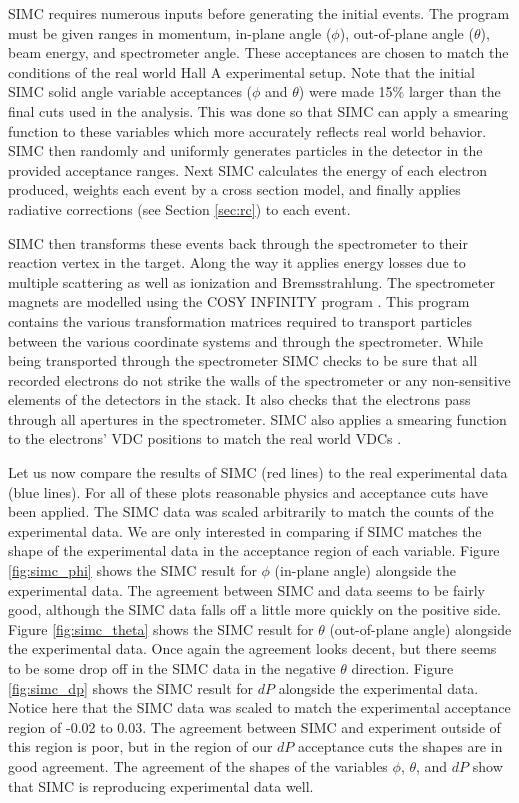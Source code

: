 SIMC requires numerous inputs before generating the initial events. The program must be given ranges in momentum, in-plane angle ($\phi$), out-of-plane angle ($\theta$), beam energy, and spectrometer angle. These acceptances are chosen to match the conditions of the real world Hall A experimental setup. Note that the initial SIMC solid angle variable acceptances ($\phi$ and $\theta$) were made 15$\%$ larger than the final cuts used in the analysis. This was done so that SIMC can apply a smearing function to these variables which more accurately reflects real world behavior. SIMC then randomly and uniformly generates particles in the detector in the provided acceptance ranges. Next SIMC calculates the energy of each electron produced, weights each event by a cross section model, and finally applies radiative corrections (see Section \ref{sec:rc}) to each event. 

SIMC then transforms these events back through the spectrometer to their reaction vertex in the target. Along the way it applies energy losses due to multiple scattering as well as ionization and Bremsstrahlung. The spectrometer magnets are modelled using the COSY INFINITY program \cite{cosy}. This program contains the various transformation matrices required to transport particles between the various coordinate systems and through the spectrometer. While being transported through the spectrometer SIMC checks to be sure that all recorded electrons do not strike the walls of the spectrometer or any non-sensitive elements of the detectors in the stack. It also checks that the electrons pass through all apertures in the spectrometer. SIMC also applies a smearing function to the electrons' VDC positions to match the real world VDCs \cite{Thesis:Wang}. 

Let us now compare the results of SIMC (red lines) to the real experimental data (blue lines). For all of these plots reasonable physics and acceptance cuts have been applied. The SIMC data was scaled arbitrarily to match the counts of the experimental data. We are only interested in comparing if SIMC matches the shape of the experimental data in the acceptance region of each variable. Figure \ref{fig:simc_phi} shows the SIMC result for $\phi$ (in-plane angle) alongside the experimental data. The agreement between SIMC and data seems to be fairly good, although the SIMC data falls off a little more quickly on the positive side. Figure \ref{fig:simc_theta} shows the SIMC result for $\theta$ (out-of-plane angle) alongside the experimental data. Once again the agreement looks decent, but there seems to be some drop off in the SIMC data in the negative $\theta$ direction. Figure \ref{fig:simc_dp} shows the SIMC result for $dP$ alongside the experimental data. Notice here that the SIMC data was scaled to match the experimental acceptance region of -0.02 to 0.03. The agreement between SIMC and experiment outside of this region is poor, but in the region of our $dP$ acceptance cuts the shapes are in good agreement. The agreement of the shapes of the variables $\phi$, $\theta$, and $dP$ show that SIMC is reproducing experimental data well.

